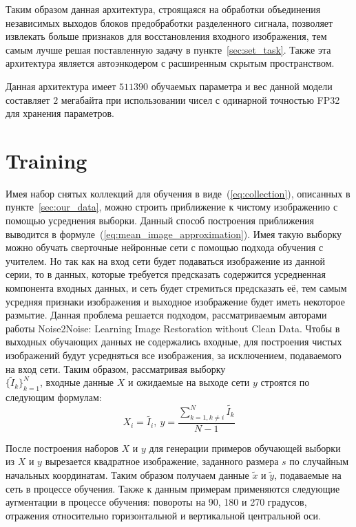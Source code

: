\documentclass[runningheads]{llncs}
\begin{document}
Таким образом данная архитектура, строящаяся на обработки объединения независимых выходов блоков предобработки разделенного сигнала, позволяет извлекать больше признаков для восстановления входного изображения, тем самым лучше решая поставленную задачу в пункте~\ref{sec:set_task}. Также эта архитектура является автоэнкодером с расширенным скрытым пространством.

Данная архитектура имеет $511390$ обучаемых параметра и вес данной модели составляет $2$ мегабайта при использовании чисел с одинарной точностью FP32 для хранения параметров.

\section{Training}
Имея набор снятых коллекций для обучения в виде~(\ref{eq:collection}), описанных в пункте~\ref{sec:our_data}, можно строить приближение к чистому изображению с помощью усреднения выборки. Данный способ построения приближения выводится в формуле~(\ref{eq:mean_image_approximation}). Имея такую выборку можно обучать сверточные нейронные сети с помощью подхода обучения с учителем. Но так как на вход сети будет подаваться изображение из данной серии, то в данных, которые требуется предсказать содержится усредненная компонента входных данных, и сеть будет стремиться предсказать её, тем самым усредняя признаки изображения и выходное изображение будет иметь некоторое размытие. Данная проблема решается подходом, рассматриваемым авторами работы Noise2Noise: Learning Image Restoration without Clean Data. Чтобы в выходных обучающих данных не содержались входные, для построения чистых изображений будут усредняться все изображения, за исключением, подаваемого на вход сети. Таким образом, рассматривая выборку \\$\{\tilde{I}_k\}_{k=1}^{N}$, входные данные $X$ и ожидаемые на выходе сети $y$ строятся по следующим формулам:
\begin{equation}\label{eq:dataset}
X_i = \tilde{I_i},\ y = \frac{\sum_{k=1, k \ne i}^{N}\tilde{I_k}}{N - 1}
\end{equation}

После построения наборов $X$ и $y$ для генерации примеров обучающей выборки из $X$ и $y$ вырезается квадратное изображение, заданного размера $s$ по случайным начальных координатам. Таким образом получаем данные $\tilde{x}$ и $\tilde{y}$, подаваемые на сеть в процессе обучения. Также к данным примерам применяются следующие аугментации в процессе обучения: повороты на 90, 180 и 270 градусов, отражения относительно горизонтальной и вертикальной центральной оси.
\end{document}
